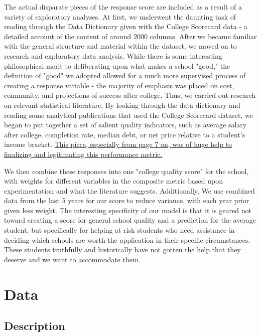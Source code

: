 \documentclass{article}\usepackage[]{graphicx}\usepackage[]{color}
\begin{document}
The actual disparate pieces of the response score are included as a result of a variety of exploratory analyses. At first, we underwent the daunting task of reading through the Data Dictionary given with the College Scorecard data - a detailed account of the content of around 2000 columns. After we became familiar with the general structure and material within the dataset, we moved on to research and exploratory data analysis. While there is some interesting philosophical merit to deliberating upon what makes a school "good," the definition of "good" we adopted allowed for a much more supervised process of creating a response variable - the majority of emphasis was placed on cost, community, and projections of success after college. Thus, we carried out research on relevant statistical literature. By looking through the data dictionary and reading some analytical publications that used the College Scorecard dataset, we began to put together a set of salient quality indicators, such as average salary after college, completion rate, median debt, or net price relative to a student's income bracket. \href{http://bit.ly/2gGW2fG}{This piece, especially from page 7 on, was of huge help to finalizing and legitimating this performance metric.}\newline

We then combine these responses into one "college quality score" for the school, with weights for different variables in the composite metric based upon experimentation and what the literature suggests. Additionally, We use combined data from the last 5 years for our score to reduce variance, with each year prior given less weight. The interesting specificity of our model is that it is geared not toward creating a score for general school quality and a prediction for the average student, but specifically for helping at-risk students who need assistance in deciding which schools are worth the application in their specific circumstances. These students truthfully and historically have not gotten the help that they deserve and we want to accommodate them.

\maketitle
\section{Data}



\subsection{Description}
\end{document}
